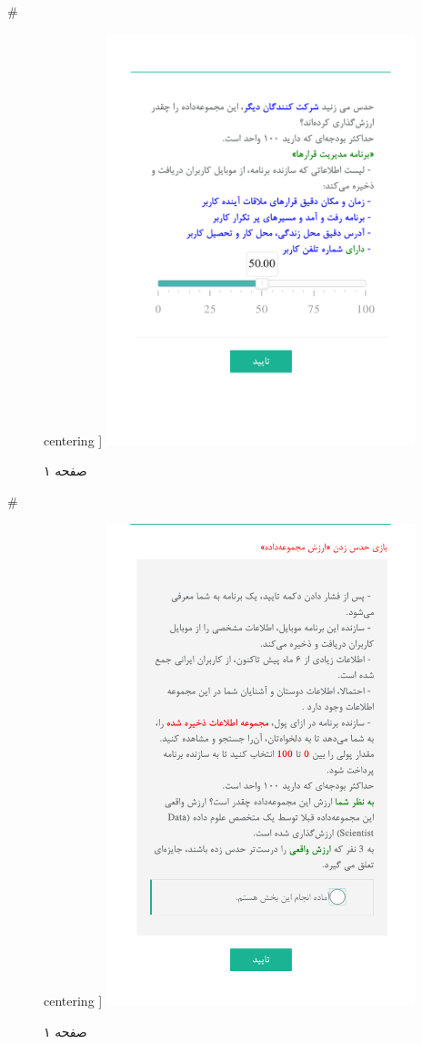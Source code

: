 { 
 # 
\begin{figure}[htpb]
centering ]
\includegraphics[width=0.8\textwidth]{./img/Task65.png/}
\caption{صفحه ۱}
\label{fig:Task1}
\end{figure}
 
 
 # 
\begin{figure}[htpb]
centering ]
\includegraphics[width=0.8\textwidth]{./img/Task66.png/}
\caption{صفحه ۱}
\label{fig:Task1}
\end{figure}
 
}
